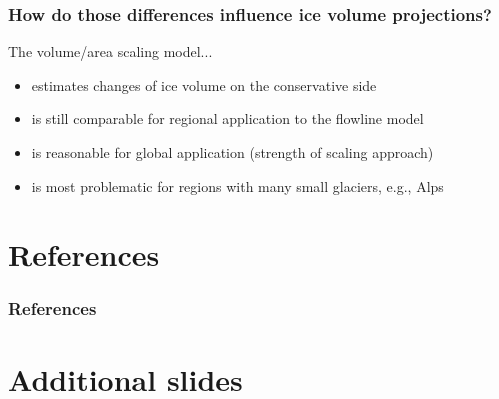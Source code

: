\documentclass[12pt, aspectratio=169, abstract=off, oneside]{beamer}
\begin{document}
    \begin{frame}[t]\frametitle{How do those differences influence ice volume projections?}
        \vspace*{0.5cm}
        \large{The volume/area scaling model...}
        \begin{itemize}
            \item<2-> estimates changes of ice volume on the conservative side
            \item<3-> is still comparable for regional application to the flowline model
            \item<4-> is reasonable for global application (strength of scaling approach)
            \item<5-> is most problematic for regions with many small glaciers, e.g., Alps
        \end{itemize}
        \vspace*{1cm}

        

    \end{frame}


\appendix
\section{References} %
\label{sec:references}

    \begin{frame}[t, allowframebreaks]\frametitle{References}
        {\footnotesize
        
        }
    \end{frame}

\section{Additional slides} %
\label{sec:additional_slides}
\end{document}
